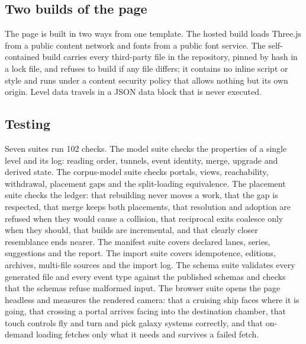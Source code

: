 \documentclass[11pt]{article}
\theoremstyle{remark}
\begin{document}
\subsection{Two builds of the page}

The page is built in two ways from one template. The hosted build loads Three.js from a public content network and fonts from a public font service. The self-contained build carries every third-party file in the repository, pinned by hash in a lock file, and refuses to build if any file differs; it contains no inline script or style and runs under a content security policy that allows nothing but its own origin. Level data travels in a JSON data block that is never executed.

\subsection{Testing}

Seven suites run 102 checks. The model suite checks the properties of a single level and its log: reading order, tunnels, event identity, merge, upgrade and derived state. The corpus-model suite checks portals, views, reachability, withdrawal, placement gaps and the split-loading equivalence. The placement suite checks the ledger: that rebuilding never moves a work, that the gap is respected, that merge keeps both placements, that resolution and adoption are refused when they would cause a collision, that reciprocal exits coalesce only when they should, that builds are incremental, and that clearly closer resemblance ends nearer. The manifest suite covers declared lanes, series, suggestions and the report. The import suite covers idempotence, editions, archives, multi-file sources and the import log. The schema suite validates every generated file and every event type against the published schemas and checks that the schemas refuse malformed input. The browser suite opens the page headless and measures the rendered camera: that a cruising ship faces where it is going, that crossing a portal arrives facing into the destination chamber, that touch controls fly and turn and pick galaxy systems correctly, and that on-demand loading fetches only what it needs and survives a failed fetch.
\end{document}
